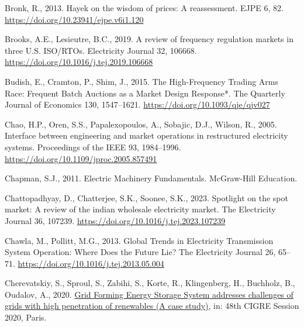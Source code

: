 \documentclass[12pt,a4paper,]{report}
\newlength{\cslhangindent}
\newenvironment{CSLReferences}[2] %
 {%
  \setlength{\parindent}{0pt}
  \ifodd #1 \everypar{\setlength{\hangindent}{\cslhangindent}}\ignorespaces\fi
  \ifnum #2 > 0
  \setlength{\parskip}{#2\baselineskip}
  \fi
 }%
 {}
\begin{document}
\begin{CSLReferences}{1}{0}
\leavevmode{}%
Bronk, R., 2013. Hayek on the wisdom of prices: A reassessment. EJPE 6,
82. \url{https://doi.org/10.23941/ejpe.v6i1.120}

\leavevmode{}%
Brooks, A.E., Lesieutre, B.C., 2019. A review of frequency regulation
markets in three {U}.{S}. {ISO}/{RTOs}. Electricity Journal 32, 106668.
\url{https://doi.org/10.1016/j.tej.2019.106668}

\leavevmode{}%
Budish, E., Cramton, P., Shim, J., 2015. The {High-Frequency Trading
Arms Race}: {Frequent Batch Auctions} as a {Market Design Response}*.
The Quarterly Journal of Economics 130, 1547--1621.
\url{https://doi.org/10.1093/qje/qjv027}

\leavevmode{}%
Chao, H.P., Oren, S.S., Papalexopoulos, A., Sobajic, D.J., Wilson, R.,
2005. Interface between engineering and market operations in
restructured electricity systems. Proceedings of the IEEE 93,
1984--1996. \url{https://doi.org/10.1109/jproc.2005.857491}

\leavevmode{}%
Chapman, S.J., 2011. Electric {Machinery Fundamentals}. McGraw-Hill
Education.

\leavevmode{}%
Chattopadhyay, D., Chatterjee, S.K., Soonee, S.K., 2023. Spotlight on
the spot market: {A} review of the indian wholesale electricity market.
The Electricity Journal 36, 107239.
\url{https://doi.org/10.1016/j.tej.2023.107239}

\leavevmode{}%
Chawla, M., Pollitt, M.G., 2013. Global {Trends} in {Electricity
Transmission System Operation}: {Where Does} the {Future Lie}? The
Electricity Journal 26, 65--71.
\url{https://doi.org/10.1016/j.tej.2013.05.004}

\leavevmode{}%
Cherevatskiy, S., Sproul, S., Zabihi, S., Korte, R., Klingenberg, H.,
Buchholz, B., Oudalov, A., 2020.
\href{https://e-cigre.org/publication/SESSION2020_C2-C6-322}{Grid
{Forming Energy Storage System} addresses challenges of grids with high
penetration of renewables ({A} case study)}, in: 48th {CIGRE Session}
2020, {Paris}.


\end{CSLReferences}
\end{document}
